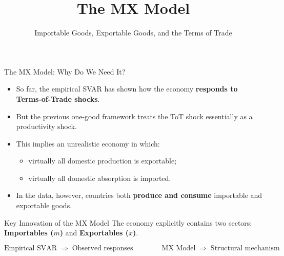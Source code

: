\documentclass[10pt]{beamer}
\title{The MX Model}
\subtitle{Importable Goods, Exportable Goods, and the Terms of Trade}
\date{}
\begin{document}
\begin{frame}\titlepage\end{frame}

\begin{frame}{The MX Model: Why Do We Need It?}
\small
\begin{itemize}
    \item So far, the empirical SVAR has shown how the economy
    \textbf{responds to Terms-of-Trade shocks}.
    \item But the previous one-good framework treats the ToT shock
    essentially as a productivity shock.
    \item This implies an unrealistic economy in which:
    \begin{itemize}
        \item virtually all domestic production is exportable;
        \item virtually all domestic absorption is imported.
    \end{itemize}
    \item In the data, however, countries both \textbf{produce and consume}
    importable and exportable goods.
\end{itemize}
\vspace{0.1cm}
\begin{block}{Key Innovation of the MX Model}
\centering
The economy explicitly contains two sectors:
\textbf{Importables ($m$)} and \textbf{Exportables ($x$)}.
\end{block}
\vspace{0.1cm}
\begin{center}
\[
\text{Empirical SVAR}
\;\Longrightarrow\;
\text{Observed responses}
\qquad\qquad
\text{MX Model}
\;\Longrightarrow\;
\text{Structural mechanism}
\]
\end{center}
\end{frame}
\end{document}

